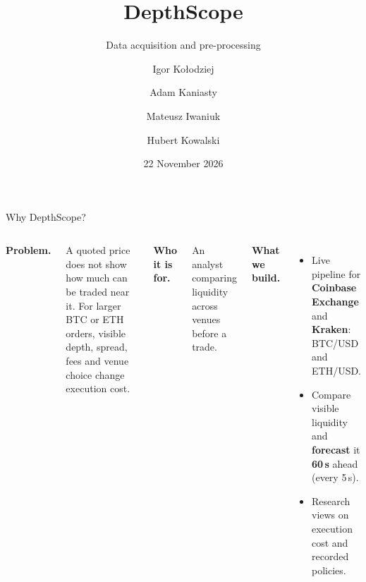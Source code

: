 \documentclass[aspectratio=169]{beamer}
\title{DepthScope}
\subtitle{Data acquisition and pre-processing}
\author[DepthScope team]{Igor Kołodziej \and Adam Kaniasty \and Mateusz Iwaniuk \and Hubert Kowalski}
\date{22 November 2026}
\begin{document}
\begin{frame}
\titlepage
\end{frame}

\begin{frame}{Why DepthScope?}
\begin{columns}[T,onlytextwidth]
\small
\textbf{Problem.}\par\vspace{0.35em}
A quoted price does not show how much can be traded near it. For larger BTC or ETH orders, visible depth, spread, fees and venue choice change execution cost.
\medskip

\textbf{Who it is for.}\par\vspace{0.35em}
An analyst comparing liquidity across venues before a trade.
\medskip

\textbf{What we build.}\par\vspace{0.35em}
\begin{itemize}\setlength{\itemsep}{0.3em}
\item Live pipeline for \textbf{Coinbase Exchange} and \textbf{Kraken}: BTC/USD and ETH/USD.
\item Compare visible liquidity and \textbf{forecast} it \textbf{60\,s} ahead (every 5\,s).
\item Research views on execution cost and recorded policies.
\end{itemize}
\centering
\vspace{0.6em}
\end{columns}
\end{frame}
\end{document}
